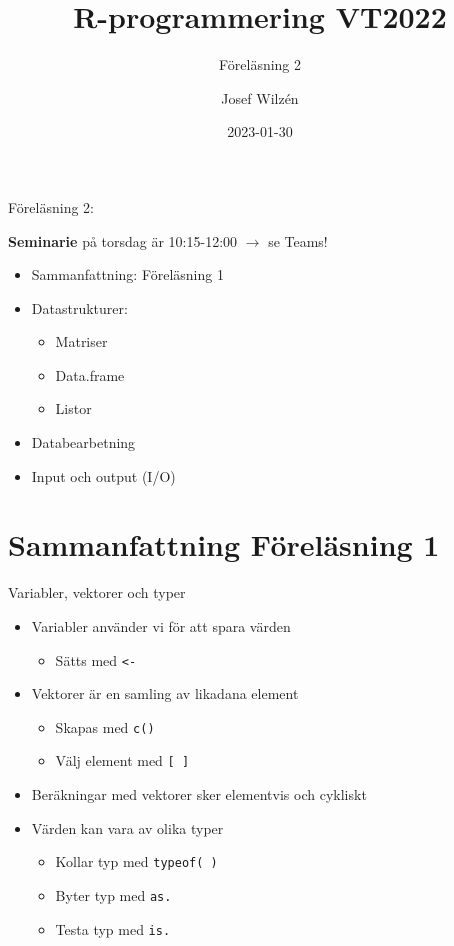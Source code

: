 \documentclass[
  11pt,
  ignorenonframetext,
]{beamer}
\title{R-programmering VT2022}
\subtitle{Föreläsning 2}
\author{Josef Wilzén}
\date{2023-01-30}
\institute{Linköpings Universitet}
\providecommand{\tightlist}{%
  \setlength{\itemsep}{0pt}\setlength{\parskip}{0pt}}
\begin{document}
\frame{\titlepage}


\begin{frame}{Föreläsning 2:}
\protect\hypertarget{fuxf6reluxe4sning-2}{}


\textbf{Seminarie} på torsdag är 10:15-12:00 $\rightarrow$ se Teams!

\begin{itemize}
\tightlist
\item
  Sammanfattning: Föreläsning 1
\item
  Datastrukturer:

  \begin{itemize}
  \tightlist
  \item
    Matriser
  \item
    Data.frame
  \item
    Listor
  \end{itemize}
\item
  Databearbetning
\item
  Input och output (I/O)
\end{itemize}
\end{frame}

\hypertarget{sammanfattning-fuxf6reluxe4sning-1}{%
\section{Sammanfattning Föreläsning
1}\label{sammanfattning-fuxf6reluxe4sning-1}}


\begin{frame}{Variabler, vektorer och typer}
\protect\hypertarget{variabler-vektorer-och-typer}{}
\begin{itemize}
\tightlist
\item
  Variabler använder vi för att spara värden

  \begin{itemize}
  \tightlist
  \item
    Sätts med \texttt{<-}
  \end{itemize}
\item
  Vektorer är en samling av likadana element

  \begin{itemize}
  \tightlist
  \item
    Skapas med \texttt{c()}
  \item
    Välj element med \texttt{[ ]}
  \end{itemize}
\item
  Beräkningar med vektorer sker elementvis och cykliskt
\item
  Värden kan vara av olika typer

  \begin{itemize}
  \tightlist
  \item
    Kollar typ med \texttt{typeof( )}
  \item
    Byter typ med \texttt{as.}
  \item
    Testa typ med \texttt{is.}
  \end{itemize}
\end{itemize}
\end{frame}
\end{document}
